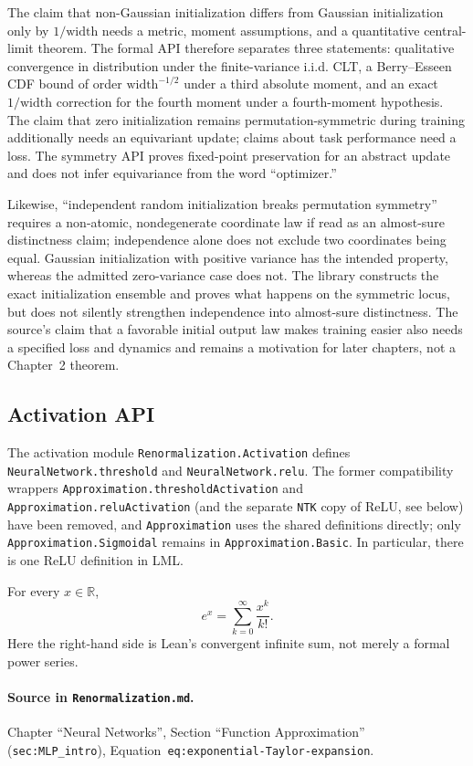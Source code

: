 \begin{remark}
The claim that non-Gaussian initialization differs from Gaussian initialization only by
$1/\text{width}$ needs a metric, moment assumptions, and a quantitative central-limit theorem.
The formal API therefore separates three statements: qualitative convergence in distribution
under the finite-variance i.i.d. CLT, a Berry--Esseen CDF bound of order
$\text{width}^{-1/2}$ under a third absolute moment, and an exact $1/\text{width}$ correction for
the fourth moment under a fourth-moment hypothesis.  The claim that zero initialization remains
permutation-symmetric during training additionally needs an equivariant update; claims about task
performance need a loss.  The symmetry API proves fixed-point preservation for an abstract update
and does not infer equivariance from the word ``optimizer.''

Likewise, ``independent random initialization breaks permutation symmetry'' requires a non-atomic,
nondegenerate coordinate law if read as an almost-sure distinctness claim; independence alone does
not exclude two coordinates being equal.  Gaussian initialization with positive variance has the
intended property, whereas the admitted zero-variance case does not.  The library constructs the
exact initialization ensemble and proves what happens on the symmetric locus, but does not silently
strengthen independence into almost-sure distinctness.  The source's claim that a favorable initial
output law makes training easier also needs a specified loss and dynamics and remains a motivation
for later chapters, not a Chapter~2 theorem.
\end{remark}

\subsection{Activation API}

The activation module \texttt{Renormalization.Activation} defines \texttt{NeuralNetwork.threshold}
and \texttt{NeuralNetwork.relu}.  The former compatibility wrappers
\texttt{Approximation.thresholdActivation} and \texttt{Approximation.reluActivation} (and the
separate \texttt{NTK} copy of ReLU, see below) have been removed, and \texttt{Approximation}
uses the shared definitions directly; only \texttt{Approximation.Sigmoidal} remains in
\texttt{Approximation.Basic}.  In particular, there is one ReLU definition in LML.

\begin{lemma}
\label{lem:renorm:expTaylor}
For every $x\in\mathbb R$,
\[
  e^x=\sum_{k=0}^{\infty}\frac{x^k}{k!}.
\]
Here the right-hand side is Lean's convergent infinite sum, not merely a formal power series.

\paragraph{Source in \texttt{Renormalization.md}.}
Chapter ``Neural Networks'', Section ``Function Approximation'' (\texttt{sec:MLP\_intro}),
Equation~\texttt{eq:exponential-Taylor-expansion}.
\end{lemma}

